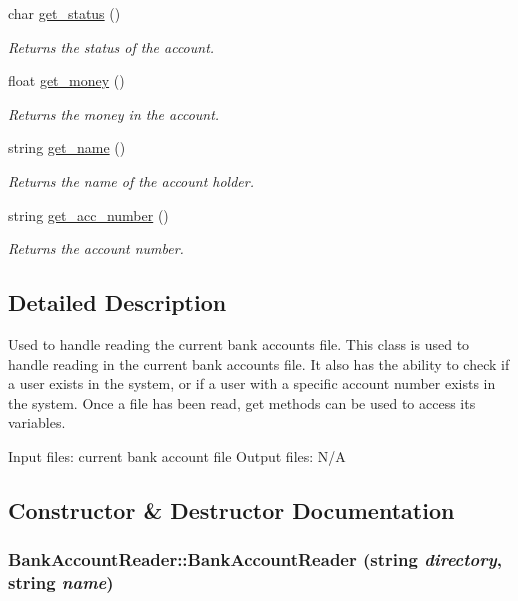\begin{DoxyCompactItemize}
char \hyperlink{classBankAccountReader_af1fd3ec664775df5d5ca4ea2c233a263}{get\_\-status} ()
\begin{DoxyCompactList}\small\item\em Returns the status of the account. \item\end{DoxyCompactList}\item 
float \hyperlink{classBankAccountReader_a1cffe6080d969d43af7dfdbe6f52e517}{get\_\-money} ()
\begin{DoxyCompactList}\small\item\em Returns the money in the account. \item\end{DoxyCompactList}\item 
string \hyperlink{classBankAccountReader_a40a0346c2fb73db498db89aa74b9fa84}{get\_\-name} ()
\begin{DoxyCompactList}\small\item\em Returns the name of the account holder. \item\end{DoxyCompactList}\item 
string \hyperlink{classBankAccountReader_a21ad21dfce6248b5ab27059954981129}{get\_\-acc\_\-number} ()
\begin{DoxyCompactList}\small\item\em Returns the account number. \item\end{DoxyCompactList}\end{DoxyCompactItemize}


\subsection{Detailed Description}
Used to handle reading the current bank accounts file. This class is used to handle reading in the current bank accounts file. It also has the ability to check if a user exists in the system, or if a user with a specific account number exists in the system. Once a file has been read, get methods can be used to access its variables.

Input files: current bank account file Output files: N/A 

\subsection{Constructor \& Destructor Documentation}
\hypertarget{classBankAccountReader_a5ff301528a8bfc7e3326d3429fd86584}{
\subsubsection[{BankAccountReader}]{\setlength{\rightskip}{0pt plus 5cm}BankAccountReader::BankAccountReader (string {\em directory}, \/  string {\em name})}}
\label{classBankAccountReader_a5ff301528a8bfc7e3326d3429fd86584}


